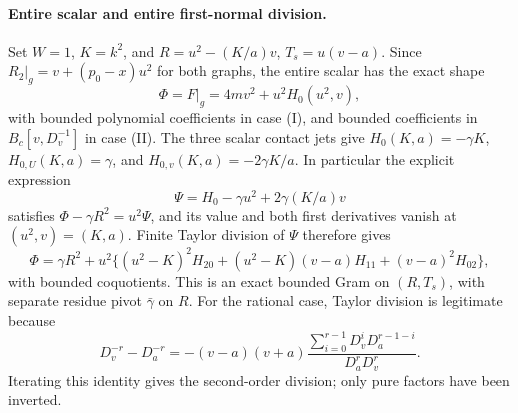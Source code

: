 \paragraph{Entire scalar and entire first-normal division.}
Set $W=1$, $K=k^2$, and
$R=u^2-(K/a)v$, $T_s=u(v-a)$.
Since $R_2|_g=v+(p_0-x)u^2$ for both graphs, the entire scalar has
the exact shape
\[
 \Phi=F|_g=4mv^2+u^2H_0(u^2,v),                    \tag{SC13}
\]
with bounded polynomial coefficients in case (I), and bounded
coefficients in $B_c[v,D_v^{-1}]$ in case (II).
The three scalar contact jets give
$H_0(K,a)=-\gamma K$, $H_{0,U}(K,a)=\gamma$, and
$H_{0,v}(K,a)=-2\gamma K/a$. In particular the explicit expression
\[
 \Psi=H_0-\gamma u^2+2\gamma(K/a)v
\]
satisfies $\Phi-\gamma R^2=u^2\Psi$, and its value and both first
derivatives vanish at $(u^2,v)=(K,a)$. Finite Taylor division of
$\Psi$ therefore gives
\[
 \Phi=\gamma R^2+u^2\{(u^2-K)^2H_{20}
       +(u^2-K)(v-a)H_{11}+(v-a)^2H_{02}\},           \tag{SC14}
\]
with bounded coquotients. This is an exact bounded Gram on
$(R,T_s)$, with separate residue pivot $\bar\gamma$ on $R$.
For the rational case, Taylor division is legitimate because
\[
 D_v^{-r}-D_a^{-r}
 =-(v-a)(v+a)
   \frac{\sum_{i=0}^{r-1}D_v^iD_a^{r-1-i}}{D_a^rD_v^r}.
\]
Iterating this identity gives the second-order division; only pure
factors have been inverted.

